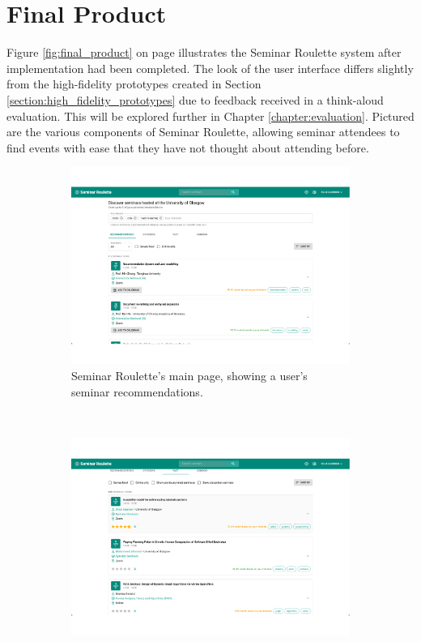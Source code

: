 \documentclass{l4proj}
\begin{document}
\section{Final Product}

Figure \ref{fig:final_product} on page \pageref{fig:final_product} illustrates the Seminar Roulette system after implementation had been completed. The look of the user interface differs slightly from the high-fidelity prototypes created in Section \ref{section:high_fidelity_prototypes} due to feedback received in a think-aloud evaluation. This will be explored further in Chapter \ref{chapter:evaluation}. Pictured are the various components of Seminar Roulette, allowing seminar attendees to find events with ease that they have not thought about attending before.
 
\begin{figure}[htb] 
    \centering
    \begin{subfigure}[b]{\textwidth}
        \includegraphics[width=\textwidth]{images/final_recommendations.pdf}
        \caption{Seminar Roulette's main page, showing a user's seminar recommendations.}
        \label{fig:final_recommendations}
    \end{subfigure}
    \\[2ex]
    \begin{subfigure}[b]{0.49\textwidth}
        \includegraphics[width=\textwidth]{images/final_past_seminars.pdf}

\end{subfigure}
\end{figure}
\end{document}
